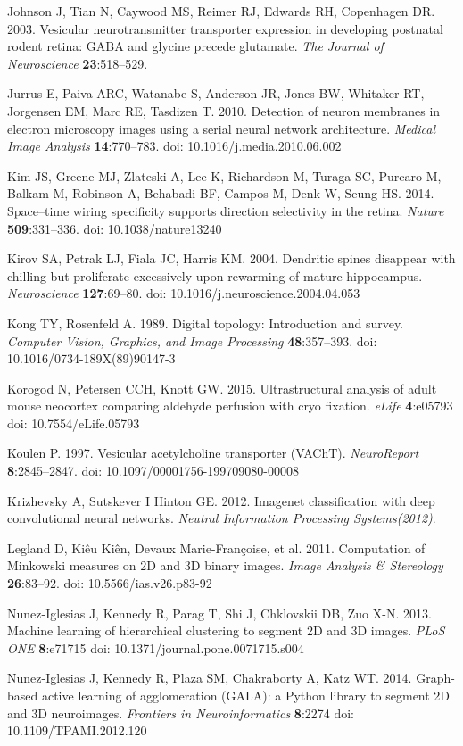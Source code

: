 \documentclass{article}
\begin{document}
\begin{hangpars}
Johnson J, Tian N, Caywood MS, Reimer RJ, Edwards RH, Copenhagen DR. 2003. Vesicular neurotransmitter transporter expression in developing postnatal rodent retina: GABA and glycine precede glutamate. \emph{The Journal of Neuroscience} \textbf{23}:518–529.

Jurrus E, Paiva ARC, Watanabe S, Anderson JR, Jones BW, Whitaker RT, Jorgensen EM, Marc RE, Tasdizen T. 2010. Detection of neuron membranes in electron microscopy images using a serial neural network architecture. \emph{Medical Image Analysis} \textbf{14}:770–783. doi: 10.1016/j.media.2010.06.002

Kim JS, Greene MJ, Zlateski A, Lee K, Richardson M, Turaga SC, Purcaro M, Balkam M, Robinson A, Behabadi BF, Campos M, Denk W, Seung HS. 2014. Space–time wiring specificity supports direction selectivity in the retina. \emph{Nature} \textbf{509}:331–336. doi: 10.1038/nature13240

Kirov SA, Petrak LJ, Fiala JC, Harris KM. 2004. Dendritic spines disappear with chilling but proliferate excessively upon rewarming of mature hippocampus. \emph{Neuroscience} \textbf{127}:69–80. doi: 10.1016/j.neuroscience.2004.04.053

Kong TY, Rosenfeld A. 1989. Digital topology: Introduction and survey. \emph{Computer Vision, Graphics, and Image Processing} \textbf{48}:357–393. doi: 10.1016/0734-189X(89)90147-3

Korogod N, Petersen CCH, Knott GW. 2015. Ultrastructural analysis of adult mouse neocortex comparing aldehyde perfusion with cryo fixation. \emph{eLife} \textbf{4}:e05793 doi: 10.7554/eLife.05793

Koulen P. 1997. Vesicular acetylcholine transporter (VAChT). \emph{NeuroReport} \textbf{8}:2845–2847. doi: 10.1097/00001756-199709080-00008

Krizhevsky A, Sutskever I Hinton GE. 2012. Imagenet classification with deep convolutional neural networks. \emph{Neutral Information Processing Systems(2012)}.

Legland D, Kiêu Kiên, Devaux Marie-Françoise, et al. 2011. Computation of Minkowski measures on 2D and 3D binary images. \emph{Image Analysis \& Stereology} \textbf{26}:83–92. doi: 10.5566/ias.v26.p83-92

Nunez-Iglesias J, Kennedy R, Parag T, Shi J, Chklovskii DB, Zuo X-N. 2013. Machine learning of hierarchical clustering to segment 2D and 3D images. \emph{PLoS ONE} \textbf{8}:e71715 doi: 10.1371/journal.pone.0071715.s004

Nunez-Iglesias J, Kennedy R, Plaza SM, Chakraborty A, Katz WT. 2014. Graph-based active learning of agglomeration (GALA): a Python library to segment 2D and 3D neuroimages. \emph{Frontiers in Neuroinformatics} \textbf{8}:2274 doi: 10.1109/TPAMI.2012.120


\end{hangpars}
\end{document}
